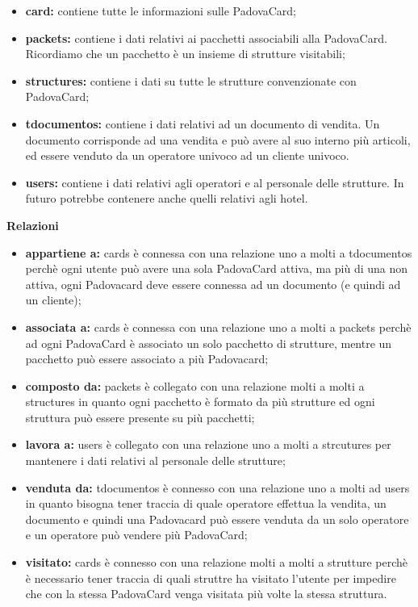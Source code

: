 \begin{itemize}
\item \textbf{card:} contiene tutte le informazioni sulle PadovaCard;
\item \textbf{packets:} contiene i dati relativi ai pacchetti associabili alla PadovaCard. Ricordiamo che un pacchetto è un insieme di strutture visitabili;
\item \textbf{structures:} contiene i dati su tutte le strutture convenzionate con PadovaCard;
\item \textbf{tdocumentos:} contiene i dati relativi ad un documento di vendita. Un documento corrisponde ad una vendita e può avere al suo interno più articoli, ed essere venduto da un operatore univoco ad un cliente univoco.
\item \textbf{users:} contiene i dati relativi agli operatori e al personale delle strutture. In futuro potrebbe contenere anche quelli relativi agli hotel.
\end{itemize}
\textbf{Relazioni}
\begin{itemize}
\item \textbf{appartiene a:} cards è connessa con una relazione uno a molti a tdocumentos perchè ogni utente può avere una sola PadovaCard attiva, ma più di una non attiva, ogni Padovacard deve essere connessa ad un documento (e quindi ad un cliente);
\item \textbf{associata a:} cards è connessa con una relazione uno a molti a packets perchè ad ogni PadovaCard è associato un solo pacchetto di strutture, mentre un pacchetto può essere associato a più Padovacard;
\item \textbf{composto da:} packets è collegato con una relazione molti a molti a structures in quanto ogni pacchetto è formato da più strutture ed ogni struttura può essere presente su più pacchetti;
\item \textbf{lavora a:} users è collegato con una relazione uno a molti a strcutures per mantenere i dati relativi al personale delle strutture;
\item \textbf{venduta da:} tdocumentos è connesso con una relazione uno a molti ad users in quanto bisogna tener traccia di quale operatore effettua la vendita, un documento e quindi una Padovacard può essere venduta da un solo operatore e un operatore può vendere più PadovaCard;
\item \textbf{visitato:} cards è connesso con una relazione molti a molti a strutture perchè è necessario tener traccia di quali struttre ha visitato l'utente per impedire che con la stessa PadovaCard venga visitata più volte la stessa struttura.


\end{itemize}


